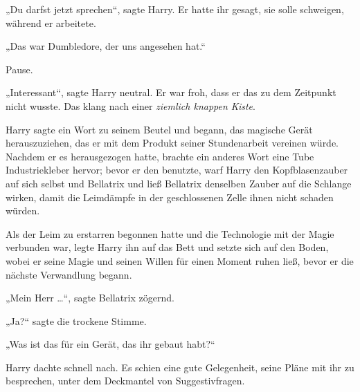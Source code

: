 „Du darfst jetzt sprechen“, sagte Harry. Er hatte ihr gesagt, sie solle schweigen, während er arbeitete.

„Das war Dumbledore, der uns angesehen hat.“

Pause.

„Interessant“, sagte Harry neutral. Er war froh, dass er das zu dem Zeitpunkt nicht wusste. Das klang nach einer \emph{ziemlich knappen Kiste}.

Harry sagte ein Wort zu seinem Beutel und begann, das magische Gerät herauszuziehen, das er mit dem Produkt seiner Stundenarbeit vereinen würde. Nachdem er es herausgezogen hatte, brachte ein anderes Wort eine Tube Industriekleber hervor; bevor er den benutzte, warf Harry den Kopfblasenzauber auf sich selbst und Bellatrix und ließ Bellatrix denselben Zauber auf die Schlange wirken, damit die Leimdämpfe in der geschlossenen Zelle ihnen nicht schaden würden.

Als der Leim zu erstarren begonnen hatte und die Technologie mit der Magie verbunden war, legte Harry ihn auf das Bett und setzte sich auf den Boden, wobei er seine Magie und seinen Willen für einen Moment ruhen ließ, bevor er die nächste Verwandlung begann.

„Mein Herr …“, sagte Bellatrix zögernd.

„Ja?“ sagte die trockene Stimme.

„Was ist das für ein Gerät, das ihr gebaut habt?“

Harry dachte schnell nach. Es schien eine gute Gelegenheit, seine Pläne mit ihr zu besprechen, unter dem Deckmantel von Suggestivfragen.

